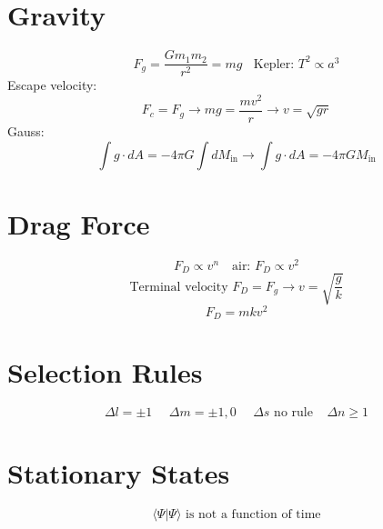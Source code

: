 \documentclass[10pt,letter]{article}
\begin{document}
\section{Gravity} %
\label{sec:gravity}
\begin{equation}
    F_g = \frac{Gm_1m_2}{r^2} = mg~~~~ \textrm{Kepler: }T^2 \propto a^3
\end{equation}
Escape velocity:
\begin{equation}
    F_c = F_g \rightarrow mg = \frac{mv^2}{r} \rightarrow v = \sqrt{gr}
\end{equation}
Gauss:
\begin{equation}
    \int g \cdot dA = -4\pi G \int dM_{\textrm{in}} \rightarrow \int g \cdot dA = -4 \pi GM_{\textrm{in}}
\end{equation}

\section{Drag Force} %
\label{sec:drag_force}
\begin{equation}
    F_D \propto v^n~~~\textrm{ air: }F_D \propto v^2
\end{equation}
\begin{equation}
    \textrm{Terminal velocity }F_D = F_g \rightarrow v = \sqrt{\frac{g}{k}}
\end{equation}
\begin{equation}
    F_D = mkv^2
\end{equation}

\section{Selection Rules} %
\label{sec:selection_rules}
\begin{equation}
    \Delta l = \pm 1 ~~~~~~  \Delta m = \pm 1,0 ~~~~~~ \Delta s \textrm{ no rule}~~~~~ \Delta n \geq 1
\end{equation}

\section{Stationary States} %
\label{sec:stationary_states}
\begin{equation}
    \langle \Psi | \Psi \rangle \textrm{ is not a function of time}
\end{equation}
\end{document}
